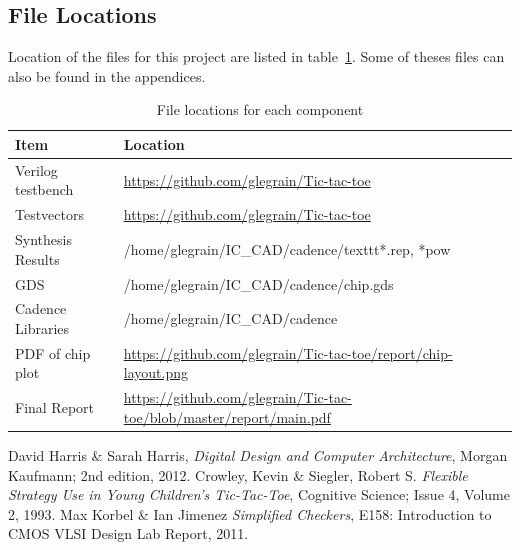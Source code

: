\documentclass[]{article}
\begin{document}
\subsection{File Locations}
Location of the files for this project are listed in table~\ref{tab:filelocations}. Some of theses files can also be found in the appendices.
\label{sec:filelocations}
\begin{table}[H]
\centering
\caption{File locations for each component}
\begin{tabular}{ |p{3cm} | l |}
\hline
    Item                & Location \\
\hline
    Verilog testbench   & \url{https://github.com/glegrain/Tic-tac-toe}\\
\hline
    Testvectors         & \url{https://github.com/glegrain/Tic-tac-toe}\\
\hline
    Synthesis Results   & /home/glegrain/IC\_CAD/cadence/texttt{*.rep, *pow}\\
\hline
    GDS                 & /home/glegrain/IC\_CAD/cadence/chip.gds\\
\hline
    Cadence Libraries   & /home/glegrain/IC\_CAD/cadence\\
\hline
    PDF of chip plot    &  \url{https://github.com/glegrain/Tic-tac-toe/report/chip-layout.png}\\ 
\hline
    Final Report        & \url{https://github.com/glegrain/Tic-tac-toe/blob/master/report/main.pdf} \\
\hline  
\end{tabular}

\label{tab:filelocations}
\end{table}






\begin{thebibliography}{widest entry}
  David Harris \& Sarah Harris,
  \emph{Digital Design and Computer Architecture},
  Morgan Kaufmann; 2nd edition,
  2012.
 Crowley, Kevin \& Siegler, Robert S.
  \emph{Flexible Strategy Use in Young Children's Tic-Tac-Toe},
  Cognitive Science; Issue 4, Volume 2,
  1993.
 Max Korbel \& Ian Jimenez
  \emph{Simplified Checkers},
  E158: Introduction to CMOS VLSI Design Lab Report,
  2011. 

\end{thebibliography}


\clearpage
\end{document}
